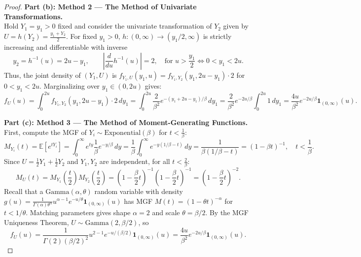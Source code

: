 \documentclass[11pt, letterpaper]{article}
\theoremstyle{definition}
\theoremstyle{remark}
\newcommand{\E}{\mathbb{E}}
\begin{document}
\begin{proof}
\textbf{Part (b): Method 2 — The Method of Univariate Transformations.} \\ \relax
Hold $Y_1 = y_1 > 0$ fixed and consider the univariate transformation of $Y_2$ given by $U = h(Y_2) = \frac{y_1 + Y_2}{2}$. For fixed $y_1 > 0$, $h : (0, \infty) \to (y_1/2, \infty)$ is strictly increasing and differentiable with inverse
\[
    y_2 = h^{-1}(u) = 2u - y_1, \qquad \left|\frac{d}{du} h^{-1}(u)\right| = 2, \quad \text{for } u > \frac{y_1}{2} \iff 0 < y_1 < 2u.
\]
Thus, the joint density of $(Y_1, U)$ is $f_{Y_1, U}(y_1, u) = f_{Y_1, Y_2}(y_1, 2u - y_1) \cdot 2$ for $0 < y_1 < 2u$. Marginalizing over $y_1 \in (0, 2u)$ gives:
\[
    f_U(u) = \int_{0}^{2u} f_{Y_1, Y_2}(y_1, 2u - y_1) \cdot 2 \, dy_1 = \int_{0}^{2u} \frac{2}{\beta^2} e^{-(y_1 + 2u - y_1)/\beta} \, dy_1 = \frac{2}{\beta^2} e^{-2u/\beta} \int_{0}^{2u} 1 \, dy_1 = \frac{4u}{\beta^2} e^{-2u/\beta} \mathbf{1}_{(0, \infty)}(u).
\]

\textbf{Part (c): Method 3 — The Method of Moment-Generating Functions.} \\ \relax
First, compute the MGF of $Y_i \sim \text{Exponential}(\beta)$ for $t < \frac{1}{\beta}$:
\[
    M_{Y_i}(t) = \E\left[e^{tY_i}\right] = \int_{0}^{\infty} e^{ty} \frac{1}{\beta} e^{-y/\beta} \, dy = \frac{1}{\beta} \int_{0}^{\infty} e^{-y(1/\beta - t)} \, dy = \frac{1}{\beta(1/\beta - t)} = (1 - \beta t)^{-1}, \quad t < \frac{1}{\beta}.
\]
Since $U = \frac{1}{2}Y_1 + \frac{1}{2}Y_2$ and $Y_1, Y_2$ are independent, for all $t < \frac{2}{\beta}$:
\[
    M_U(t) = M_{Y_1}\left(\frac{t}{2}\right) M_{Y_2}\left(\frac{t}{2}\right) = \left(1 - \frac{\beta}{2} t\right)^{-1} \left(1 - \frac{\beta}{2} t\right)^{-1} = \left(1 - \frac{\beta}{2} t\right)^{-2}.
\]
Recall that a $\text{Gamma}(\alpha, \theta)$ random variable with density $g(u) = \frac{1}{\Gamma(\alpha)\theta^{\alpha}} u^{\alpha - 1} e^{-u/\theta} \mathbf{1}_{(0, \infty)}(u)$ has MGF $M(t) = (1 - \theta t)^{-\alpha}$ for $t < 1/\theta$. Matching parameters gives shape $\alpha = 2$ and scale $\theta = \beta/2$. By the MGF Uniqueness Theorem, $U \sim \text{Gamma}(2, \beta/2)$, so
\[
    f_U(u) = \frac{1}{\Gamma(2)(\beta/2)^2} u^{2 - 1} e^{-u/(\beta/2)} \mathbf{1}_{(0, \infty)}(u) = \frac{4u}{\beta^2} e^{-2u/\beta} \mathbf{1}_{(0, \infty)}(u).
\]


\end{proof}
\end{document}
